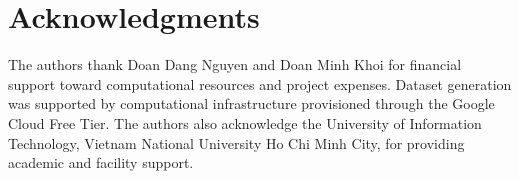 \section*{Acknowledgments}

The authors thank Doan Dang Nguyen and Doan Minh Khoi for financial support toward computational resources and project expenses. Dataset generation was supported by computational infrastructure provisioned through the Google Cloud Free Tier. The authors also acknowledge the University of Information Technology, Vietnam National University Ho Chi Minh City, for providing academic and facility support.